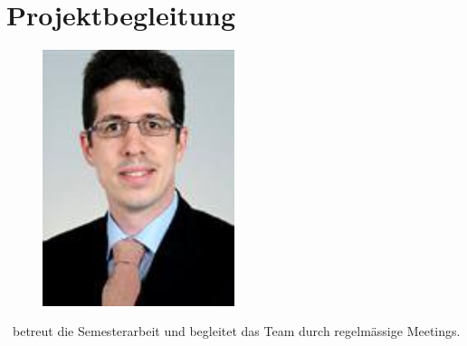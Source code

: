 \section{Projektbegleitung}
\begin{figure}[H]
	\begin{minipage}[b]{0.5\linewidth}
		\includegraphics[width=0.5\textwidth]{../projektplan/img/lblaeser.jpg}
		\centering
		\caption{\teacher}
		\label{fig:bläser}
	\end{minipage}
\end{figure}
\teacher\ betreut die Semesterarbeit und begleitet das Team durch regelmässige Meetings.
